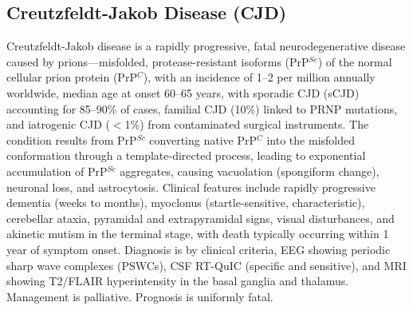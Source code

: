 



\label{sec:Prion Diseases}

\subsection{Creutzfeldt-Jakob Disease (CJD)}
\label{sec:Creutzfeldt-Jakob Disease}
Creutzfeldt-Jakob disease is a rapidly progressive, fatal neurodegenerative disease caused by prions---misfolded, protease-resistant isoforms (PrP$^{Sc}$) of the normal cellular prion protein (PrP$^{C}$), with an incidence of 1--2 per million annually worldwide, median age at onset 60--65 years, with sporadic CJD (sCJD) accounting for 85--90\% of cases, familial CJD (10\%) linked to PRNP mutations, and iatrogenic CJD ($<$1\%) from contaminated surgical instruments. The condition results from PrP$^{Sc}$ converting native PrP$^{C}$ into the misfolded conformation through a template-directed process, leading to exponential accumulation of PrP$^{Sc}$ aggregates, causing vacuolation (spongiform change), neuronal loss, and astrocytosis. Clinical features include rapidly progressive dementia (weeks to months), myoclonus (startle-sensitive, characteristic), cerebellar ataxia, pyramidal and extrapyramidal signs, visual disturbances, and akinetic mutism in the terminal stage, with death typically occurring within 1 year of symptom onset. Diagnosis is by clinical criteria, EEG showing periodic sharp wave complexes (PSWCs), CSF RT-QuIC (specific and sensitive), and MRI showing T2/FLAIR hyperintensity in the basal ganglia and thalamus. Management is palliative. Prognosis is uniformly fatal.

